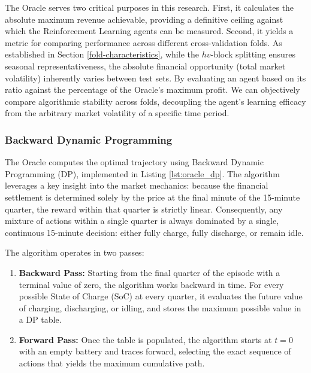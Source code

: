             The Oracle serves two critical purposes in this research. First, it calculates the absolute maximum revenue achievable, providing a definitive ceiling against which the Reinforcement Learning agents can be measured. Second, it yields a metric for comparing performance across different cross-validation folds. As established in Section \ref{fold-characteristics}, while the $hv$-block splitting ensures seasonal representativeness, the absolute financial opportunity (total market volatility) inherently varies between test sets. By evaluating an agent based on its ratio against the percentage of the Oracle's maximum profit. We can objectively compare algorithmic stability across folds, decoupling the agent's learning efficacy from the arbitrary market volatility of a specific time period.
            
            \subsubsection{Backward Dynamic Programming}
            
            The Oracle computes the optimal trajectory using Backward Dynamic Programming (DP), implemented in Listing \ref{lst:oracle_dp}. The algorithm leverages a key insight into the market mechanics: because the financial settlement is determined solely by the price at the final minute of the 15-minute quarter, the reward within that quarter is strictly linear. Consequently, any mixture of actions within a single quarter is always dominated by a single, continuous 15-minute decision: either fully charge, fully discharge, or remain idle. 
            
            The algorithm operates in two passes:
            \begin{enumerate}
                \item \textbf{Backward Pass:} Starting from the final quarter of the episode with a terminal value of zero, the algorithm works backward in time. For every possible State of Charge (SoC) at every quarter, it evaluates the future value of charging, discharging, or idling, and stores the maximum possible value in a DP table.
                \item \textbf{Forward Pass:} Once the table is populated, the algorithm starts at $t=0$ with an empty battery and traces forward, selecting the exact sequence of actions that yields the maximum cumulative path.
            \end{enumerate}
            
